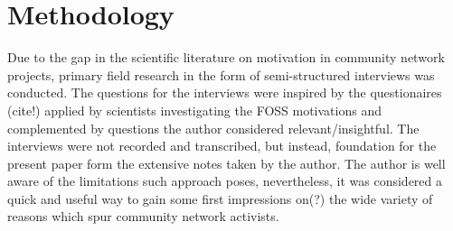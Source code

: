 \section{Methodology}

Due to the gap in the scientific literature on motivation in community network projects, primary field research in the form of semi-structured interviews was conducted.
The questions for the interviews were inspired by the questionaires (cite!) applied by scientists investigating the FOSS motivations and complemented by questions the author considered relevant/insightful. %
The interviews were not recorded and transcribed, but instead, foundation for the present paper form the extensive notes taken by the author. %
The author is well aware of the limitations such approach poses, nevertheless, it was considered a quick and useful way to gain some first impressions on(?) the wide variety of reasons which spur community network activists.

\begin{comment}
\begin{itemize}
  \item literature review for FOSS <-- only as comparison
  \item semi-structured interviews for Freifunk <-- focus
    \begin{itemize}
      \item limitations of the methodology
    \end{itemize}
\end{itemize}
\end{comment}
